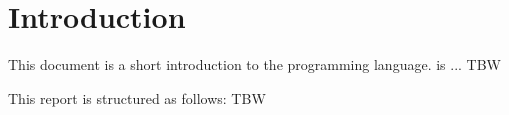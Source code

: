 
\chapter{Introduction}
\label{chap:intro}

This document is a short introduction to the \hocl programming language. \hocl is ... TBW

\medskip This report is structured as follows:  TBW


